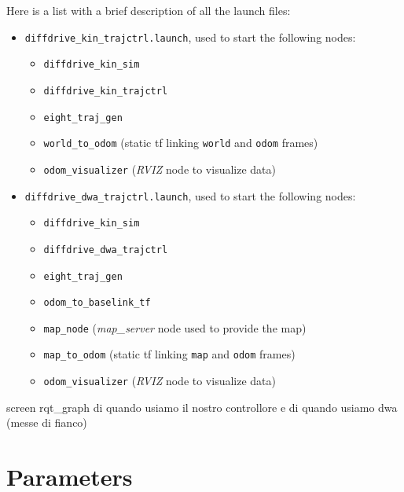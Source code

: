 \documentclass[11pt,a4paper]{article}
\begin{document}
Here is a list with a brief description of all the launch files:\\
\begin{itemize}
    \item \texttt{diffdrive\_kin\_trajctrl.launch}, used to start the following nodes:
        \begin{itemize}
            \item \texttt{diffdrive\_kin\_sim}
            \item \texttt{diffdrive\_kin\_trajctrl}
            \item \texttt{eight\_traj\_gen}
            \item \texttt{world\_to\_odom} (static tf linking \texttt{world} and \texttt{odom} frames)
            \item \texttt{odom\_visualizer} (\textit{RVIZ} node to visualize data)\\
        \end{itemize}

    \item \texttt{diffdrive\_dwa\_trajctrl.launch}, used to start the following nodes:
        \begin{itemize}
            \item \texttt{diffdrive\_kin\_sim}
            \item \texttt{diffdrive\_dwa\_trajctrl}
            \item \texttt{eight\_traj\_gen}
            \item \texttt{odom\_to\_baselink\_tf}
            \item \texttt{map\_node} (\textit{map\_server} node used to provide the map)
            \item \texttt{map\_to\_odom} (static tf linking \texttt{map} and \texttt{odom} frames)
            \item \texttt{odom\_visualizer} (\textit{RVIZ} node to visualize data)
        \end{itemize}
\end{itemize}


screen rqt\_graph di quando usiamo il nostro controllore e di quando usiamo dwa (messe di fianco)



\section{Parameters}
\end{document}
